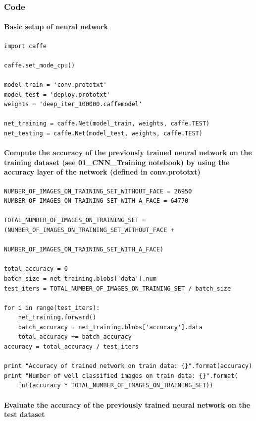 \documentclass[french]{article}
\begin{document}
\subsubsection{Code}

\paragraph{Basic setup of neural network}

\begin{verbatim}
import caffe

caffe.set_mode_cpu()

model_train = 'conv.prototxt'
model_test = 'deploy.prototxt'
weights = 'deep_iter_100000.caffemodel'

net_training = caffe.Net(model_train, weights, caffe.TEST)
net_testing = caffe.Net(model_test, weights, caffe.TEST)
\end{verbatim}

\paragraph{Compute the accuracy of the previously trained neural network on the training dataset (see 01\_CNN\_Training notebook) by using the accuracy layer of the network (defined in conv.prototxt)}

\begin{verbatim}
NUMBER_OF_IMAGES_ON_TRAINING_SET_WITHOUT_FACE = 26950
NUMBER_OF_IMAGES_ON_TRAINING_SET_WITH_A_FACE = 64770

TOTAL_NUMBER_OF_IMAGES_ON_TRAINING_SET = (NUMBER_OF_IMAGES_ON_TRAINING_SET_WITHOUT_FACE +
                                          NUMBER_OF_IMAGES_ON_TRAINING_SET_WITH_A_FACE)

total_accuracy = 0
batch_size = net_training.blobs['data'].num
test_iters = TOTAL_NUMBER_OF_IMAGES_ON_TRAINING_SET / batch_size

for i in range(test_iters):
    net_training.forward()
    batch_accuracy = net_training.blobs['accuracy'].data
    total_accuracy += batch_accuracy
accuracy = total_accuracy / test_iters

print "Accuracy of trained network on train data: {}".format(accuracy)
print "Number of well classified images on train data: {}".format(
    int(accuracy * TOTAL_NUMBER_OF_IMAGES_ON_TRAINING_SET))
\end{verbatim}

\paragraph{Evaluate the accuracy of the previously trained neural network on the test dataset}
\end{document}
